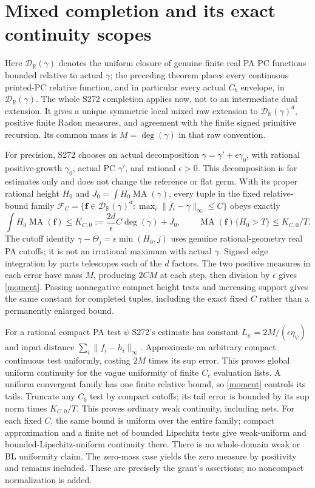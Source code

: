 \documentclass[11pt]{article}
\theoremstyle{definition}\newtheorem{definition}[theorem]{Definition}
\theoremstyle{remark}\newtheorem{remark}[theorem]{Remark}
\newcommand{\R}{\mathbb R}\newcommand{\Q}{\mathbb Q}
\newcommand{\MA}{\operatorname{MA}}\newcommand{\relint}{\operatorname{relint}}
\newcommand{\D}{\mathcal D_{\R}(\gamma)}
\begin{document}
\section{Mixed completion and its exact continuity scopes}
Here $\D$ denotes the uniform closure of genuine finite real PA PC functions bounded relative to actual $\gamma$; the preceding theorem places every continuous printed-PC relative function, and in particular every actual $C_b$ envelope, in $\D$. The whole S272 completion applies now, not to an intermediate dual extension. It gives a unique symmetric local mixed raw extension to $\D^d$, positive finite Radon measures, and agreement with the finite signed primitive recursion. Its common mass is $M=\deg(\gamma)$ in that raw convention.

For precision, S272 chooses an actual decomposition $\gamma=\gamma'+\epsilon\gamma_0$, with rational positive-growth $\gamma_0$, actual PC $\gamma'$, and rational $\epsilon>0$. This decomposition is for estimates only and does not change the reference or flat germ. With its proper rational height $H_0$ and $J_0=\int H_0\MA(\gamma)$, every tuple in the fixed relative-bound family
$\mathcal F_C=\{\mathbf f\in\D^d:\max_i\|f_i-\gamma\|_\infty\leq C\}$ obeys exactly
\begin{equation}\label{moment}
\int H_0\MA(\mathbf f)\leq K_{C,0}:=\frac{2d}{\epsilon}C\deg(\gamma)+J_0,\qquad
\MA(\mathbf f)\{H_0>T\}\leq K_{C,0}/T.
\end{equation}
The cutoff identity $\gamma-\Theta_j=\epsilon\min(H_0,j)$ uses genuine rational-geometry real PA cutoffs; it is not an irrational maximum with actual $\gamma$. Signed edge integration by parts telescopes each of the $d$ factors. The two positive measures in each error have mass $M$, producing $2CM$ at each step, then division by $\epsilon$ gives \eqref{moment}. Passing nonnegative compact height tests and increasing support gives the same constant for completed tuples, including the exact fixed $C$ rather than a permanently enlarged bound.

For a rational compact PA test $\psi$ S272's estimate has constant $L_\psi=2M/(\epsilon\eta_\psi)$ and input distance $\sum_i\|f_i-h_i\|_\infty$. Approximate an arbitrary compact continuous test uniformly, costing $2M$ times its sup error. This proves global uniform continuity for the vague uniformity of finite $C_c$ evaluation lists. A uniform convergent family has one finite relative bound, so \eqref{moment} controls its tails. Truncate any $C_b$ test by compact cutoffs; its tail error is bounded by its sup norm times $K_{C,0}/T$. This proves ordinary weak continuity, including nets. For each fixed $C$, the same bound is uniform over the entire family; compact approximation and a finite net of bounded Lipschitz tests give weak-uniform and bounded-Lipschitz-uniform continuity there. There is no whole-domain weak or BL uniformity claim. The zero-mass case yields the zero measure by positivity and remains included. These are precisely the grant's assertions; no noncompact normalization is added.
\end{document}
